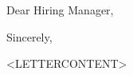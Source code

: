 \documentclass[12pt,letter,sans]{moderncv}        %
\begin{document}
\date{<DATETODAY>}
\opening{Dear Hiring Manager,}
\closing{Sincerely,}
\makelettertitle

<LETTERCONTENT>

\makeletterclosing


\newpage
\end{document}
